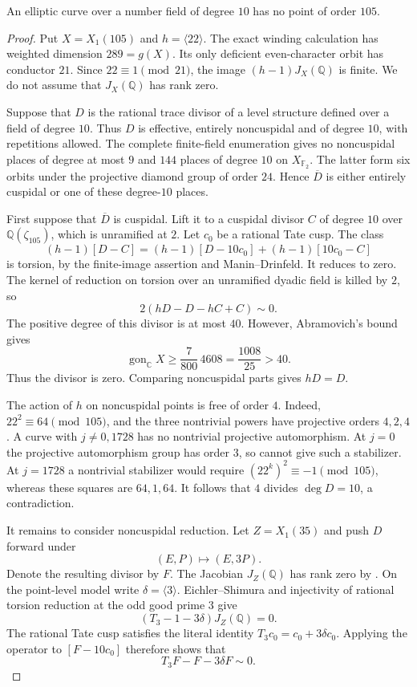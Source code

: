 \begin{proposition}\label{prop:decic-no105}
An elliptic curve over a number field of degree $10$ has no point of
order $105$.
\end{proposition}
\begin{proof}
Put $X=X_1(105)$ and $h=\langle22\rangle$. The exact winding
calculation has weighted dimension $289=g(X)$. Its only deficient
even-character orbit has conductor $21$. Since $22\equiv1\pmod{21}$,
the image $(h-1)J_X(\mathbb Q)$ is finite. We do not assume that
$J_X(\mathbb Q)$ has rank zero.

Suppose that $D$ is the rational trace divisor of a level structure
defined over a field of degree $10$. Thus $D$ is effective, entirely
noncuspidal and of degree $10$, with repetitions allowed. The complete
finite-field enumeration gives no noncuspidal places of degree at
most $9$ and $144$ places of degree $10$ on $X_{\mathbb F_2}$.
The latter form six orbits under the projective diamond group of
order $24$. Hence $\overline D$ is either entirely cuspidal or one
of these degree-$10$ places.

First suppose that $\overline D$ is cuspidal. Lift it to a cuspidal
divisor $C$ of degree $10$ over $\mathbb Q(\zeta_{105})$, which is
unramified at $2$. Let $c_0$ be a rational Tate cusp. The class
\[
 (h-1)[D-C]=(h-1)[D-10c_0]+(h-1)[10c_0-C]
\]
is torsion, by the finite-image assertion and Manin--Drinfeld. It
reduces to zero. The kernel of reduction on torsion over an unramified
dyadic field is killed by $2$, so
\[
                    2(hD-D-hC+C)\sim0.
\]
The positive degree of this divisor is at most $40$. However,
Abramovich's bound~\cite{Abramovich} gives
\[
 \operatorname{gon}_{\mathbb C}X
 \geq\frac7{800}\,4608=\frac{1008}{25}>40.
\]
Thus the divisor is zero. Comparing noncuspidal parts gives $hD=D$.

The action of $h$ on noncuspidal points is free of order $4$.
Indeed, $22^2\equiv64\pmod{105}$, and the three nontrivial powers
have projective orders $4,2,4$. A curve with $j\ne0,1728$ has no
nontrivial projective automorphism. At $j=0$ the projective
automorphism group has order $3$, so cannot give such a stabilizer.
At $j=1728$ a nontrivial stabilizer would require
$(22^k)^2\equiv-1\pmod{105}$, whereas these squares are $64,1,64$.
It follows that $4$ divides $\deg D=10$, a contradiction.

It remains to consider noncuspidal reduction. Let
$Z=X_1(35)$ and push $D$ forward under
\[
                  (E,P)\longmapsto(E,3P).
\]
Denote the resulting divisor by $F$. The Jacobian $J_Z(\mathbb Q)$
has rank zero by \cite[Theorem~3.1(2)]{DEHMZ}. On the point-level model
write $\delta=\langle3\rangle$. Eichler--Shimura and injectivity of
rational torsion reduction at the odd good prime $3$ give
\[
                     (T_3-1-3\delta)J_Z(\mathbb Q)=0.
\]
The rational Tate cusp satisfies the literal identity
$T_3c_0=c_0+3\delta c_0$. Applying the operator to $[F-10c_0]$
therefore shows that
\[
                         T_3F-F-3\delta F\sim0.        \tag{105.1}
\]


\end{proof}
